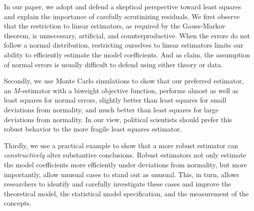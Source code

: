 \documentclass[12pt]{article}
\begin{document}
In our paper, we adopt and defend a skeptical perspective toward least squares and explain the importance of carefully scrutinizing residuals.
We first observe that the restriction to linear estimators, as required by the Gauss-Markov theorem, is unnecessary, artificial, and counterproductive. 
When the errors do not follow a normal distribution, restricting ourselves to linear estimators limits our ability to efficiently estimate the model coefficients. And as \cite{BerryFeldman1985} claim, the assumption of normal errors is usually difficult to defend using either theory or data. 

Secondly, we use Monte Carlo simulations to show that our preferred estimator, an $M$-estimator with a biweight objective function, performs almost as well as least squares for normal errors, slightly better than least squares for small deviations from normality, and much better than least squares for large deviations from normality. 
In our view, political scientists should prefer this robust behavior to the more fragile least squares estimator.

Thirdly, we use a practical example to show that a more robust estimator can \textit{constructively} alter substantive conclusions. 
Robust estimators not only estimate the model coefficients more efficiently under deviations from normality, but more importantly, allow unusual cases to stand out as unusual. 
This, in turn, allows researchers to identify and carefully investigate these cases and improve the theoretical model, the statistical model specification, and the measurement of the concepts.

\singlespace


\end{document}
